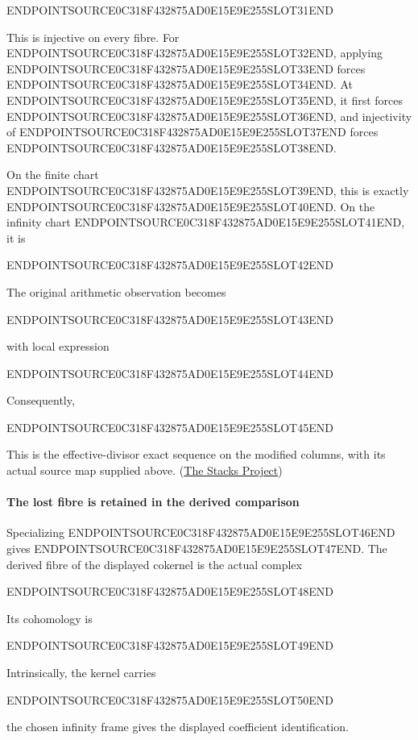 ENDPOINTSOURCE0C318F432875AD0E15E9E255SLOT31END

This is injective on every fibre. For ENDPOINTSOURCE0C318F432875AD0E15E9E255SLOT32END, applying ENDPOINTSOURCE0C318F432875AD0E15E9E255SLOT33END forces ENDPOINTSOURCE0C318F432875AD0E15E9E255SLOT34END. At ENDPOINTSOURCE0C318F432875AD0E15E9E255SLOT35END, it first forces ENDPOINTSOURCE0C318F432875AD0E15E9E255SLOT36END, and injectivity of ENDPOINTSOURCE0C318F432875AD0E15E9E255SLOT37END forces ENDPOINTSOURCE0C318F432875AD0E15E9E255SLOT38END.

On the finite chart ENDPOINTSOURCE0C318F432875AD0E15E9E255SLOT39END, this is exactly ENDPOINTSOURCE0C318F432875AD0E15E9E255SLOT40END. On the infinity chart ENDPOINTSOURCE0C318F432875AD0E15E9E255SLOT41END, it is

ENDPOINTSOURCE0C318F432875AD0E15E9E255SLOT42END

The original arithmetic observation becomes

ENDPOINTSOURCE0C318F432875AD0E15E9E255SLOT43END

with local expression

ENDPOINTSOURCE0C318F432875AD0E15E9E255SLOT44END

Consequently,

ENDPOINTSOURCE0C318F432875AD0E15E9E255SLOT45END

This is the effective-divisor exact sequence on the modified columns, with its actual source map supplied above. (\href{https://stacks.math.columbia.edu/tag/0C6K}{The Stacks Project})

\paragraph{The lost fibre is retained in the derived comparison}\label{endpoint-curvature_original--the-lost-fibre-is-retained-in-the-derived-comparison}

Specializing ENDPOINTSOURCE0C318F432875AD0E15E9E255SLOT46END gives ENDPOINTSOURCE0C318F432875AD0E15E9E255SLOT47END. The derived fibre of the displayed cokernel is the actual complex

ENDPOINTSOURCE0C318F432875AD0E15E9E255SLOT48END

Its cohomology is

ENDPOINTSOURCE0C318F432875AD0E15E9E255SLOT49END

Intrinsically, the kernel carries

ENDPOINTSOURCE0C318F432875AD0E15E9E255SLOT50END

the chosen infinity frame gives the displayed coefficient identification.

